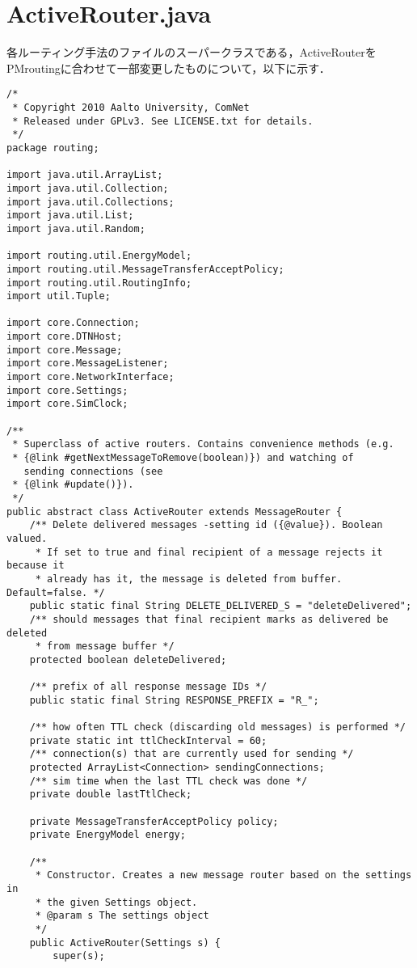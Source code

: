 \documentclass[11pt]{icsthesis}
\begin{document}
\section{ActiveRouter.java}
各ルーティング手法のファイルのスーパークラスである，ActiveRouterをPMroutingに合わせて一部変更したものについて，以下に示す．
\begin{framed}
\begin{verbatim}
/* 
 * Copyright 2010 Aalto University, ComNet
 * Released under GPLv3. See LICENSE.txt for details. 
 */
package routing;

import java.util.ArrayList;
import java.util.Collection;
import java.util.Collections;
import java.util.List;
import java.util.Random;

import routing.util.EnergyModel;
import routing.util.MessageTransferAcceptPolicy;
import routing.util.RoutingInfo;
import util.Tuple;

import core.Connection;
import core.DTNHost;
import core.Message;
import core.MessageListener;
import core.NetworkInterface;
import core.Settings;
import core.SimClock;

/**
 * Superclass of active routers. Contains convenience methods (e.g. 
 * {@link #getNextMessageToRemove(boolean)}) and watching of 
   sending connections (see
 * {@link #update()}).
 */
public abstract class ActiveRouter extends MessageRouter {
	/** Delete delivered messages -setting id ({@value}). Boolean valued.
	 * If set to true and final recipient of a message rejects it because it
	 * already has it, the message is deleted from buffer. Default=false. */
	public static final String DELETE_DELIVERED_S = "deleteDelivered";
	/** should messages that final recipient marks as delivered be deleted
	 * from message buffer */
	protected boolean deleteDelivered;
		
	/** prefix of all response message IDs */
	public static final String RESPONSE_PREFIX = "R_";
	
	/** how often TTL check (discarding old messages) is performed */
	private static int ttlCheckInterval = 60;
	/** connection(s) that are currently used for sending */
	protected ArrayList<Connection> sendingConnections;
	/** sim time when the last TTL check was done */
	private double lastTtlCheck;
	
	private MessageTransferAcceptPolicy policy;
	private EnergyModel energy;

	/**
	 * Constructor. Creates a new message router based on the settings in
	 * the given Settings object.
	 * @param s The settings object
	 */
	public ActiveRouter(Settings s) {
		super(s);
		

\end{verbatim}
\end{framed}
\end{document}
